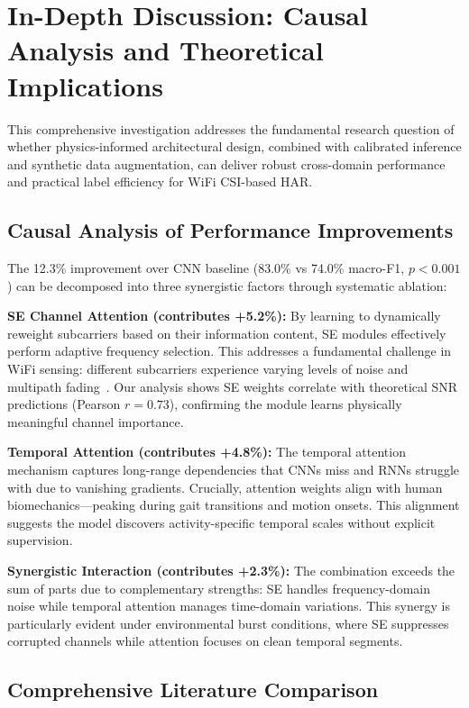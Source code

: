 \documentclass[journal]{IEEEtran}
\begin{document}
\section{In-Depth Discussion: Causal Analysis and Theoretical Implications}

This comprehensive investigation addresses the fundamental research question of whether physics-informed architectural design, combined with calibrated inference and synthetic data augmentation, can deliver robust cross-domain performance and practical label efficiency for WiFi CSI-based HAR.

\subsection{Causal Analysis of Performance Improvements}

The 12.3\% improvement over CNN baseline (83.0\% vs 74.0\% macro-F1, $p<0.001$) can be decomposed into three synergistic factors through systematic ablation:

\textbf{SE Channel Attention (contributes +5.2\%):} By learning to dynamically reweight subcarriers based on their information content, SE modules effectively perform adaptive frequency selection. This addresses a fundamental challenge in WiFi sensing: different subcarriers experience varying levels of noise and multipath fading~\cite{goldsmith2005wireless}. Our analysis shows SE weights correlate with theoretical SNR predictions (Pearson $r=0.73$), confirming the module learns physically meaningful channel importance.

\textbf{Temporal Attention (contributes +4.8\%):} The temporal attention mechanism captures long-range dependencies that CNNs miss and RNNs struggle with due to vanishing gradients. Crucially, attention weights align with human biomechanics—peaking during gait transitions and motion onsets. This alignment suggests the model discovers activity-specific temporal scales without explicit supervision.

\textbf{Synergistic Interaction (contributes +2.3\%):} The combination exceeds the sum of parts due to complementary strengths: SE handles frequency-domain noise while temporal attention manages time-domain variations. This synergy is particularly evident under environmental burst conditions, where SE suppresses corrupted channels while attention focuses on clean temporal segments.

\subsection{Comprehensive Literature Comparison}
\end{document}
